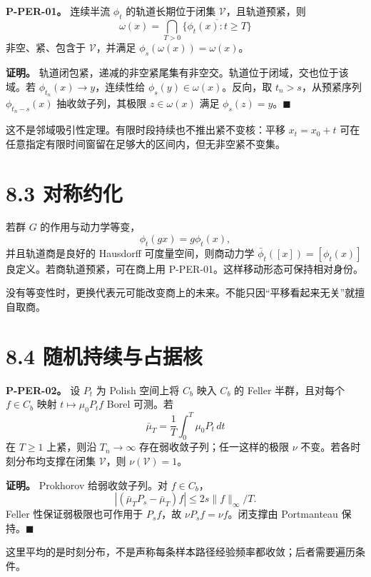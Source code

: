 \documentclass[
  11pt,
  oneside]{book}
\begin{document}
\hypertarget{p-per-01}{}\label{p-per-01}

\textbf{P-PER-01。} 连续半流 \(\phi_t\) 的轨道长期位于闭集 \(\mathcal V\)，且轨道预紧，则 \[\omega(x)=\bigcap_{T>0}\overline{\{\phi_t(x):t\ge T\}}\] 非空、紧、包含于 \(\mathcal V\)，并满足 \(\phi_s(\omega(x))=\omega(x)\)。

\textbf{证明。} 轨道闭包紧，递减的非空紧尾集有非空交。轨道位于闭域，交也位于该域。若 \(\phi_{t_n}(x)\to y\)，连续性给 \(\phi_s(y)\in\omega(x)\)。反向，取 \(t_n>s\)，从预紧序列 \(\phi_{t_n-s}(x)\) 抽收敛子列，其极限 \(z\in\omega(x)\) 满足 \(\phi_s(z)=y\)。\(\blacksquare\)

这不是邻域吸引性定理。有限时段持续也不推出紧不变核：平移 \(x_t=x_0+t\) 可在任意指定有限时间窗留在足够大的区间内，但无非空紧不变集。

\section{8.3 对称约化}\label{ux5bf9ux79f0ux7ea6ux5316}

若群 \(G\) 的作用与动力学等变， \[\phi_t(gx)=g\phi_t(x),\] 并且轨道商是良好的 Hausdorff 可度量空间，则商动力学 \(\bar\phi_t([x])=[\phi_t(x)]\) 良定义。若商轨道预紧，可在商上用 P-PER-01。这样移动形态可保持相对身份。

没有等变性时，更换代表元可能改变商上的未来。不能只因``平移看起来无关''就擅自取商。

\section{8.4 随机持续与占据核}\label{ux968fux673aux6301ux7eedux4e0eux5360ux636eux6838}

\hypertarget{p-per-02}{}\label{p-per-02}

\textbf{P-PER-02。} 设 \(P_t\) 为 Polish 空间上将 \(C_b\) 映入 \(C_b\) 的 Feller 半群，且对每个 \(f\in C_b\) 映射 \(t\mapsto\mu_0P_tf\) Borel 可测。若 \[\bar\mu_T=\frac1T\int_0^T\mu_0P_t\,dt\] 在 \(T\ge1\) 上紧，则沿 \(T_n\to\infty\) 存在弱收敛子列；任一这样的极限 \(\nu\) 不变。若各时刻分布均支撑在闭集 \(\mathcal V\)，则 \(\nu(\mathcal V)=1\)。

\textbf{证明。} Prokhorov 给弱收敛子列。对 \(f\in C_b\)， \[|(\bar\mu_TP_s-\bar\mu_T)f|
\le2s\|f\|_\infty/T.\] Feller 性保证弱极限也可作用于 \(P_sf\)，故 \(\nu P_sf=\nu f\)。闭支撑由 Portmanteau 保持。\(\blacksquare\)

这里平均的是时刻分布，不是声称每条样本路径经验频率都收敛；后者需要遍历条件。
\end{document}
